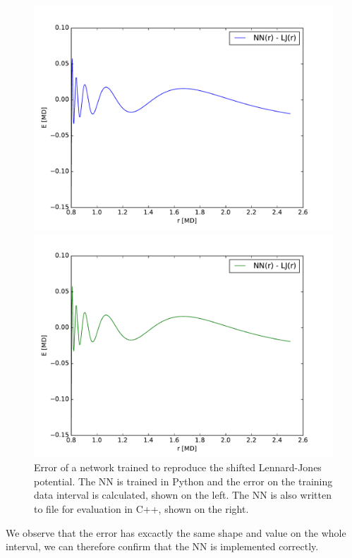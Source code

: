 \documentclass[twoside,english]{uiofysmaster}
\begin{document}
\begin{figure}[H]
\begin{minipage}[t]{0.48\linewidth}
  \includegraphics[width=\textwidth]{Figures/Tests/errorLJ.pdf}
\end{minipage}
\quad
\begin{minipage}[t]{0.48\linewidth}
\includegraphics[width=\textwidth]{Figures/Tests/errorLJC.pdf}
\end{minipage}
  \caption{Error of a network trained to reproduce the shifted Lennard-Jones potential. 
           The NN is trained in Python and the error on the training data interval
           is calculated, shown on the left. The NN is also written to file for evaluation in C++, 
           shown on the right.}
\label{fig:errorLJTest}
\end{figure}
We observe that the error has excactly the same shape and value on the whole interval, we can therefore
confirm that the NN is implemented correctly. 
\end{document}
